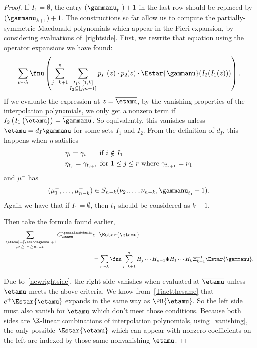 \begin{proof}
If $I_1 = \emptyset$, the entry $(\gammanu_{t_1})+1$ in the last row should be replaced by \mbox{$(\gammanu_{k+1})+1$}. The constructions so far allow us to compute the partially-symmetric Macdonald polynomials which appear in the Pieri expansion, by considering evaluations of~\eqref{rightside}. First, we rewrite that equation using the operator expansions we have found:
\begin{equation}\label{newrightside}
    \sum_{\nu \sim \lambda} \fnu\left( \sum_{j=k+1}^n    \sum\limits_{\substack{I_1 \subseteq [1,k] \\ I_2 \subseteq [j, n-1]}} p_{I_1}(z) \cdot p_2(z)  \cdot \Estar{\gammanu}(I_2(I_1(z))) \right).
\end{equation} If we evaluate the expression at $z=\overline{\etamu}$, by the vanishing properties of the interpolation polynomials, we only get a nonzero term if $I_2\left( I_1 \left( \overline{\etamu} \right) \right) = \overline{\gammanu}$. So equivalently, this vanishes unless $\etamu = d_I\gammanu$ for some sets $I_1$ and $I_2$. From the definition of $d_I$, this happens when $\eta$ satisfies
\begin{align}
    &\eta_i = \gamma_i \hspace*{.55cm}\text{ if } i\notin I_1 \label{part1}\\
    &\eta_{t_j}=\gamma_{t_{j+1}} \text{ for } 1\leq j \leq r \text{ where } \gamma_{t_{r+1}} = \nu_1\label{part2}
\end{align}
and $\mu^-$ has
\begin{align}
    (\mu_1^-, \dotsc, \mu_{n-k}^- ) \in S_{n-k} (\nu_2, \dotsc, \nu_{n-k}, \gammanu_{t_1}+1).\label{part3}
\end{align}
Again we have that if $I_1 = \emptyset$, then $t_1$ should be considered as $k+1$. 

Then take the formula found earlier,
\begin{align*}   \sum_{\substack{|\etamu| = |\lambdagamma| + 1 \\ \mu_1 \geq \, \dotsm \, \geq \mu_{n-k}}}  C^{\gammalambdamin}_{\etamu} &e^+ \Estar{\etamu}  \\ &=  \sum_{\nu \sim \lambda} \fnu  \sum_{j=k+1}^n  H_j \dotsm H_{n-1} \Phi H_1 \dotsm H_{k} \, \Xi_{k+1}^{-1}  \Estar{\gammanu}.\end{align*}

Due to~\eqref{newrightside}, the right side vanishes when evaluated at $\overline{\etamu}$ unless $\etamu$ meets the above criteria. We know from~\eqref{Tiactthesame} that $e^+ \Estar{\etamu}$ expands in the same way as $ \PB{\etamu}$. So the left side must also vanish for $\etamu$ which don't meet those conditions. Because both sides are $\K$-linear combinations of interpolation polynomials,  using~\eqref{vanishing}, the only possible $\Estar{\etamu}$ which can appear with nonzero coefficients on the left are indexed by those same nonvanishing $\etamu$.


\end{proof}
